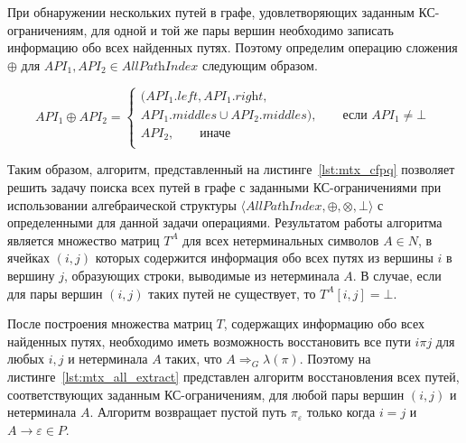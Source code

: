 При обнаружении нескольких путей в графе, удовлетворяющих заданным КС-ограничениям, для одной и той же пары вершин необходимо записать информацию обо всех найденных путях. Поэтому определим операцию сложения $\oplus$ для \mbox{$\textit{API}_1, \textit{API}_2 \in \textit{AllPathIndex}$} следующим образом.

$$\textit{API}_1 \oplus \textit{API}_2 = \begin{cases}
      (\textit{API}_1.\textit{left}, \textit{API}_1.\textit{right}, \\ \textit{API}_1.\textit{middles} \cup \textit{API}_2.\textit{middles}), \qquad \text{если $\textit{API}_1\neq \bot$} \\
      \textit{API}_2, \qquad \text{иначе} \\
    \end{cases}\
$$

Таким образом, алгоритм, представленный на листинге~\ref{lst:mtx_cfpq} позволяет решить задачу поиска всех путей в графе с заданными КС-ограничениями при использовании алгебраической структуры $\langle \textit{AllPathIndex}, \oplus, \otimes, \bot \rangle$ с определенными для данной задачи операциями. Результатом работы алгоритма является множество матриц $T^A$ для всех нетерминальных символов $A \in N$, в ячейках $(i, j)$ которых содержится информация обо всех путях из вершины $i$ в вершину $j$, образующих строки, выводимые из нетерминала $A$. В случае, если для пары вершин $(i, j)$ таких путей не существует, то $T^A[i, j] = \bot$.

После построения множества матриц $T$, содержащих информацию обо всех найденных путях, необходимо иметь возможность восстановить все пути $i \pi j$ для любых $i, j$ и нетерминала $A$ таких, что $A \Rightarrow_G \lambda(\pi)$. Поэтому на листинге~\ref{lst:mtx_all_extract} представлен алгоритм восстановления всех путей, соответствующих заданным КС-ограничениям, для любой пары вершин $(i, j)$ и нетерминала $A$. Алгоритм возвращает пустой путь $\pi_{\varepsilon}$ только когда $i = j$ и $A \to \varepsilon \in P$.


